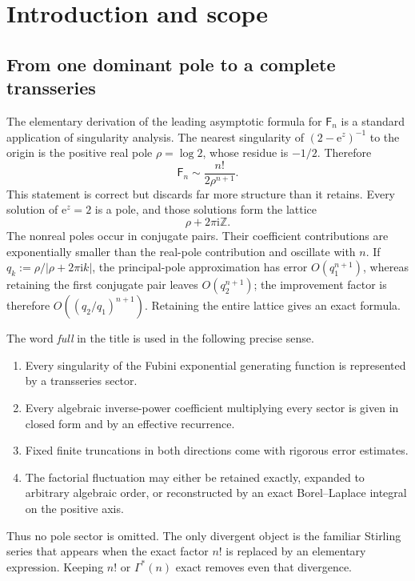 \documentclass[11pt,a4paper,oneside]{article}
\theoremstyle{definition}
\theoremstyle{remark}
\newcommand{\Fub}{\mathsf{F}}
\newcommand{\e}{\mathrm{e}}
\newcommand{\ii}{\mathrm{i}}
\newcommand{\GammaStar}{\Gamma^{\!*}}
\begin{document}
\section{Introduction and scope}\label{sec:introduction}

\subsection{From one dominant pole to a complete transseries}
The elementary derivation of the leading asymptotic formula for $\Fub_n$ is a
standard application of singularity analysis.  The nearest singularity of
$(2-\e^z)^{-1}$ to the origin is the positive real pole $\rho=\log2$, whose
residue is $-1/2$.  Therefore
\[
 \Fub_n\sim\frac{n!}{2\rho^{n+1}}.
\]
This statement is correct but discards far more structure than it retains.
Every solution of $\e^z=2$ is a pole, and those solutions form the lattice
\[
 \rho+2\pi\ii\mathbb Z.
\]
The nonreal poles occur in conjugate pairs.  Their coefficient contributions
are exponentially smaller than the real-pole contribution and oscillate with
$n$.  If $q_k:=\rho/|\rho+2\pi\ii k|$, the principal-pole approximation
has error $O(q_1^{n+1})$, whereas retaining the first conjugate pair leaves
$O(q_2^{n+1})$; the improvement factor is therefore
$O((q_2/q_1)^{n+1})$.  Retaining the entire lattice gives an exact formula.

The word \emph{full} in the title is used in the following precise sense.
\begin{enumerate}
 \item Every singularity of the Fubini exponential generating function is
       represented by a transseries sector.
 \item Every algebraic inverse-power coefficient multiplying every sector is
       given in closed form and by an effective recurrence.
 \item Fixed finite truncations in both directions come with rigorous error
       estimates.
 \item The factorial fluctuation may either be retained exactly, expanded to
       arbitrary algebraic order, or reconstructed by an exact Borel--Laplace
       integral on the positive axis.
\end{enumerate}
Thus no pole sector is omitted.  The only divergent object is the familiar
Stirling series that appears when the exact factor $n!$ is replaced by an
elementary expression.  Keeping $n!$ or $\GammaStar(n)$ exact removes even
that divergence.
\end{document}
